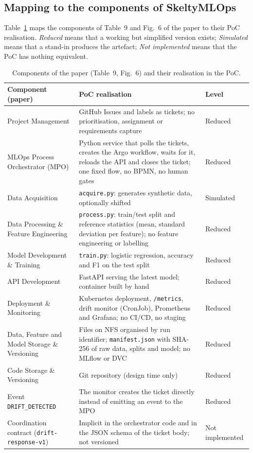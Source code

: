 \documentclass[11pt,a4paper]{article}
\begin{document}
\subsection{Mapping to the components of SkeltyMLOps}

Table~\ref{tab:poc-mapping} maps the components of Table~9 and Fig.~6 of the paper to their PoC realisation. \emph{Reduced} means that a working but simplified version exists; \emph{Simulated} means that a stand-in produces the artefact; \emph{Not implemented} means that the PoC has nothing equivalent.

\begin{table}[t]
\centering
\caption{Components of the paper (Table~9, Fig.~6) and their realisation in the PoC.}
\label{tab:poc-mapping}
\small
\begin{tabularx}{\textwidth}{@{}>{\raggedright\arraybackslash}p{3.6cm} X >{\raggedright\arraybackslash}p{2.6cm}@{}}
\toprule
Component (paper) & PoC realisation & Level \\
\midrule
Project Management & GitHub Issues and labels as tickets; no prioritisation, assignment or requirements capture & Reduced \\
MLOps Process Orchestrator (MPO) & Python service that polls the tickets, creates the Argo workflow, waits for it, reloads the API and closes the ticket; one fixed flow, no BPMN, no human gates & Reduced \\
Data Acquisition & \texttt{acquire.py}: generates synthetic data, optionally shifted & Simulated \\
Data Processing \& Feature Engineering & \texttt{process.py}: train/test split and reference statistics (mean, standard deviation per feature); no feature engineering or labelling & Reduced \\
Model Development \& Training & \texttt{train.py}: logistic regression, accuracy and F1 on the test split & Reduced \\
API Development & FastAPI serving the latest model; container built by hand & Reduced \\
Deployment \& Monitoring & Kubernetes deployment, \texttt{/metrics}, drift monitor (CronJob), Prometheus and Grafana; no CI/CD, no staging & Reduced \\
Data, Feature and Model Storage \& Versioning & Files on NFS organised by run identifier; \texttt{manifest.json} with SHA-256 of raw data, splits and model; no MLflow or DVC & Reduced \\
Code Storage \& Versioning & Git repository (design time only) & Reduced \\
Event \texttt{DRIFT\_DETECTED} & The monitor creates the ticket directly instead of emitting an event to the MPO & Reduced \\
Coordination contract (\texttt{drift-response-v1}) & Implicit in the orchestrator code and in the JSON schema of the ticket body; not versioned & Not implemented \\
\bottomrule
\end{tabularx}
\end{table}
\end{document}
